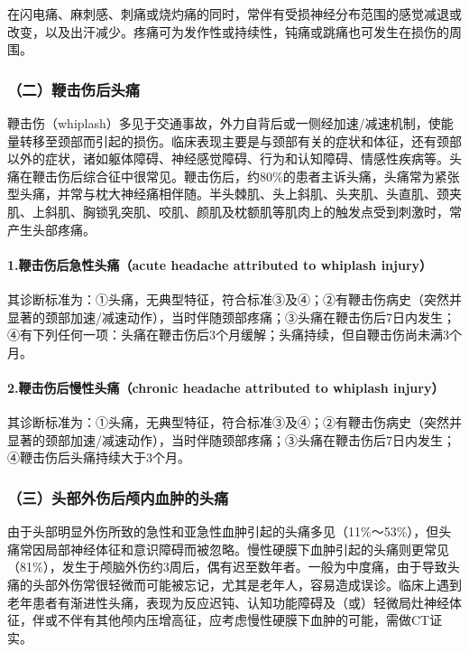 在闪电痛、麻刺感、刺痛或烧灼痛的同时，常伴有受损神经分布范围的感觉减退或改变，以及出汗减少。疼痛可为发作性或持续性，钝痛或跳痛也可发生在损伤的周围。

\subsubsection{（二）鞭击伤后头痛}

鞭击伤（whiplash）多见于交通事故，外力自背后或一侧经加速/减速机制，使能量转移至颈部而引起的损伤。临床表现主要是与颈部有关的症状和体征，还有颈部以外的症状，诸如躯体障碍、神经感觉障碍、行为和认知障碍、情感性疾病等。头痛在鞭击伤后综合征中很常见。鞭击伤后，约80\%的患者主诉头痛，头痛常为紧张型头痛，并常与枕大神经痛相伴随。半头棘肌、头上斜肌、头夹肌、头直肌、颈夹肌、上斜肌、胸锁乳突肌、咬肌、颜肌及枕额肌等肌肉上的触发点受到刺激时，常产生头部疼痛。

\paragraph{1.鞭击伤后急性头痛（acute headache attributed to whiplash injury）}

其诊断标准为：①头痛，无典型特征，符合标准③及④；②有鞭击伤病史（突然并显著的颈部加速/减速动作），当时伴随颈部疼痛；③头痛在鞭击伤后7日内发生；④有下列任何一项：头痛在鞭击伤后3个月缓解；头痛持续，但自鞭击伤尚未满3个月。

\paragraph{2.鞭击伤后慢性头痛（chronic headache attributed to whiplash injury）}

其诊断标准为：①头痛，无典型特征，符合标准③及④；②有鞭击伤病史（突然并显著的颈部加速/减速动作），当时伴随颈部疼痛；③头痛在鞭击伤后7日内发生；④鞭击伤后头痛持续大于3个月。

\subsubsection{（三）头部外伤后颅内血肿的头痛}

由于头部明显外伤所致的急性和亚急性血肿引起的头痛多见（11\%～53\%），但头痛常因局部神经体征和意识障碍而被忽略。慢性硬膜下血肿引起的头痛则更常见（81\%），发生于颅脑外伤约3周后，偶有迟至数年者。一般为中度痛，由于导致头痛的头部外伤常很轻微而可能被忘记，尤其是老年人，容易造成误诊。临床上遇到老年患者有渐进性头痛，表现为反应迟钝、认知功能障碍及（或）轻微局灶神经体征，伴或不伴有其他颅内压增高征，应考虑慢性硬膜下血肿的可能，需做CT证实。

